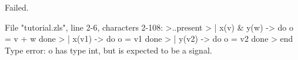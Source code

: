 \chklistingfalse
{}
\begin{ChkListingMsg}
Failed.
\end{ChkListingMsg}
\begin{ChkListingErr}
File "tutorial.zls", line 2-6, characters 2-108:
>..present
>  | x(v) & y(w) -> do o = v + w done
>  | x(v1) -> do o = v1 done
>  | y(v2) -> do o = v2 done
>  end
Type error: o has type
int, but is expected to be a signal.
\end{ChkListingErr}
